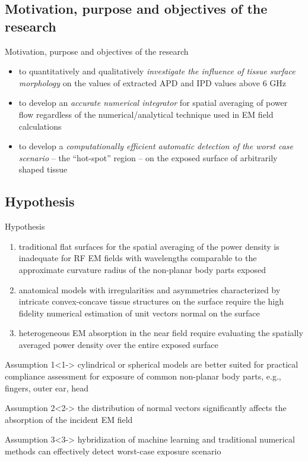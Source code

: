 \documentclass[xcolor=dvipsnames,10pt]{beamer}
\begin{document}
\subsection{Motivation, purpose and objectives of the research}
\begin{frame}{Motivation, purpose and objectives of the research}
    \begin{itemize}
        \item to quantitatively and qualitatively \emph{investigate the influence of tissue surface morphology} on the values of extracted APD and IPD values above 6 GHz
        \item to develop an \emph{accurate numerical integrator} for spatial averaging of power flow regardless of the numerical/analytical technique used in EM field calculations
        \item to develop a \emph{computationally efficient automatic detection of the worst case scenario} -- the ``hot-spot'' region -- on the exposed surface of arbitrarily shaped tissue
    \end{itemize}
\end{frame}

\subsection{Hypothesis}
\begin{frame}{Hypothesis}
    \begin{enumerate}
        \item<only@1> traditional flat surfaces for the spatial averaging of the power density is inadequate for RF EM fields with wavelengths comparable to the approximate curvature radius of the non-planar body parts exposed
        \item<only@2> anatomical models with irregularities and asymmetries characterized by intricate convex-concave tissue structures on the surface require the high fidelity numerical estimation of unit vectors normal on the surface
        \item<only@3> heterogeneous EM absorption in the near field require evaluating the spatially averaged power density over the entire exposed surface
    \end{enumerate}
    \begin{block}{Assumption 1}<1->
        cylindrical or spherical models are better suited for practical compliance assessment for exposure of common non-planar body parts, e.g., fingers, outer ear, head
    \end{block}
    \begin{block}{Assumption 2}<2->
        the distribution of normal vectors significantly affects the absorption of the incident EM field
    \end{block}
    \begin{block}{Assumption 3}<3->
        hybridization of machine learning and traditional numerical methods can effectively detect worst-case exposure scenario
    \end{block}
\end{frame}
\end{document}
